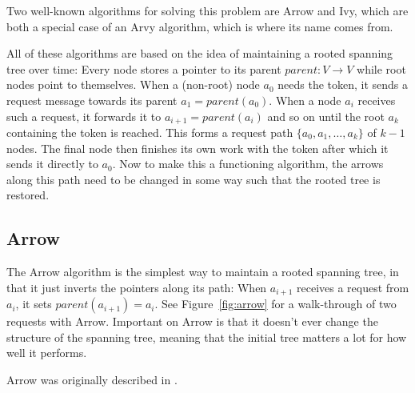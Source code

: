 \documentclass[a4paper, oneside]{discothesis}
\begin{document}
Two well-known algorithms for solving this problem are Arrow and Ivy, which are both a special case of an Arvy algorithm, which is where its name comes from.

All of these algorithms are based on the idea of maintaining a rooted spanning tree over time: Every node stores a pointer to its parent $parent : V \rightarrow V$ while root nodes point to themselves. When a (non-root) node $a_0$ needs the token, it sends a request message towards its parent $a_1=parent(a_0)$. When a node $a_i$ receives such a request, it forwards it to $a_{i+1}=parent(a_i)$ and so on until the root $a_k$ containing the token is reached. This forms a request path $\{a_0,a_1,\dots,a_k\}$ of $k-1$ nodes. The final node then finishes its own work with the token after which it sends it directly to $a_0$. Now to make this a functioning algorithm, the arrows along this path need to be changed in some way such that the rooted tree is restored.

\subsection{Arrow}
\label{intro:arrow}

The Arrow algorithm is the simplest way to maintain a rooted spanning tree, in that it just inverts the pointers along its path: When $a_{i+1}$ receives a request from $a_i$, it sets $parent(a_{i+1})=a_i$. See Figure~\ref{fig:arrow} for a walk-through of two requests with Arrow. Important on Arrow is that it doesn't ever change the structure of the spanning tree, meaning that the initial tree matters a lot for how well it performs.

Arrow was originally described in \cite{Ray}.

\end{document}
